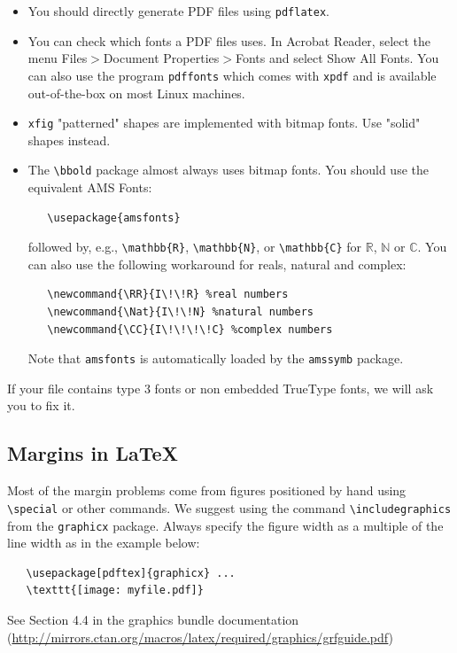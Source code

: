 \documentclass{article}
\begin{document}
\begin{itemize}


\item You should directly generate PDF files using \verb+pdflatex+.


\item You can check which fonts a PDF files uses.  In Acrobat Reader, select the
  menu Files$>$Document Properties$>$Fonts and select Show All Fonts. You can
  also use the program \verb+pdffonts+ which comes with \verb+xpdf+ and is
  available out-of-the-box on most Linux machines.


\item \verb+xfig+ "patterned" shapes are implemented with bitmap fonts.  Use
  "solid" shapes instead.


\item The \verb+\bbold+ package almost always uses bitmap fonts.  You should use
  the equivalent AMS Fonts:
\begin{verbatim}
   \usepackage{amsfonts}
\end{verbatim}
followed by, e.g., \verb+\mathbb{R}+, \verb+\mathbb{N}+, or \verb+\mathbb{C}+
for $\mathbb{R}$, $\mathbb{N}$ or $\mathbb{C}$.  You can also use the following
workaround for reals, natural and complex:
\begin{verbatim}
   \newcommand{\RR}{I\!\!R} %real numbers
   \newcommand{\Nat}{I\!\!N} %natural numbers
   \newcommand{\CC}{I\!\!\!\!C} %complex numbers
\end{verbatim}
Note that \verb+amsfonts+ is automatically loaded by the \verb+amssymb+ package.


\end{itemize}


If your file contains type 3 fonts or non embedded TrueType fonts, we will ask
you to fix it.


\subsection{Margins in \LaTeX{}}


Most of the margin problems come from figures positioned by hand using
\verb+\special+ or other commands. We suggest using the command
\verb+\includegraphics+ from the \verb+graphicx+ package. Always specify the
figure width as a multiple of the line width as in the example below:
\begin{verbatim}
   \usepackage[pdftex]{graphicx} ...
   \texttt{[image: myfile.pdf]}
\end{verbatim}
See Section 4.4 in the graphics bundle documentation
(\url{http://mirrors.ctan.org/macros/latex/required/graphics/grfguide.pdf})
\end{document}
